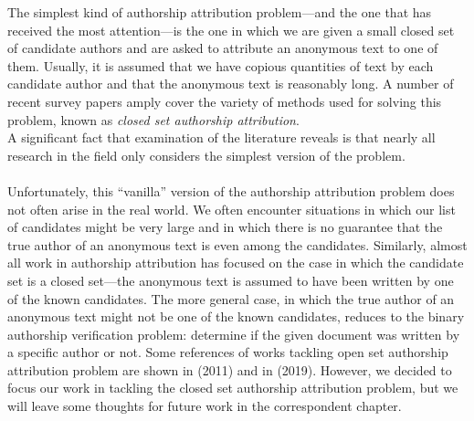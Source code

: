The simplest kind of authorship attribution problem—and the one that has received the most attention—is the one in which we are given a small closed set of candidate authors and are asked to attribute an anonymous text to one of them. Usually, it is assumed that we have copious quantities of text by each candidate author and that the anonymous text is reasonably long. A number of recent survey papers amply cover the variety of methods used for solving this problem, known as \textit{closed set authorship attribution}.\\
A significant fact that examination of the literature reveals is that nearly all research in the field only considers the simplest version of the problem.\\\\
Unfortunately, this “vanilla” version of the authorship attribution problem does not often arise in the real world. We often encounter situations in which our list of candidates might be very large and in which there is no guarantee that the true author of an anonymous text is even among the candidates. \cite{koppel2012fundamental}
Similarly, almost all work in authorship attribution has focused on the case in which the candidate set is a closed set—the anonymous text is assumed to have been written by one of the known candidates. The more general case, in which the true author of an anonymous text might not be one of the known candidates, reduces to the binary authorship verification problem: determine if the given document was written by a specific author or not.
Some references of works tackling open set authorship attribution problem are shown in \citeauthor{koppel2011authorship} (2011) and in \citeauthor{badirli2019open} (2019).
However, we decided to focus our work in tackling the closed set authorship attribution problem, but we will leave some thoughts for future work in the correspondent chapter.